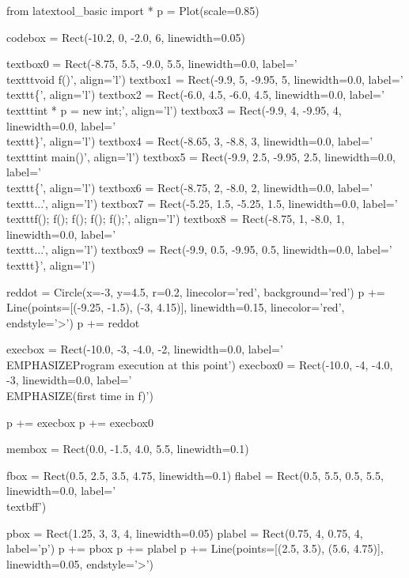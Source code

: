 \begin{python}
from latextool_basic import *
p = Plot(scale=0.85)

codebox = Rect(-10.2, 0, -2.0, 6, linewidth=0.05)

textbox0 = Rect(-8.75, 5.5, -9.0, 5.5, linewidth=0.0, label='\\texttt{void f()}', align='l')
textbox1 = Rect(-9.9, 5, -9.95, 5, linewidth=0.0, label='\\texttt{\{}', align='l')
textbox2 = Rect(-6.0, 4.5, -6.0, 4.5, linewidth=0.0, label='\\texttt{int * p = new int;}', align='l')
textbox3 = Rect(-9.9, 4, -9.95, 4, linewidth=0.0, label='\\texttt{\}}', align='l')
textbox4 = Rect(-8.65, 3, -8.8, 3, linewidth=0.0, label='\\texttt{int main()}', align='l')
textbox5 = Rect(-9.9, 2.5, -9.95, 2.5, linewidth=0.0, label='\\texttt{\{}', align='l')
textbox6 = Rect(-8.75, 2, -8.0, 2, linewidth=0.0, label='\\texttt{...}', align='l')
textbox7 = Rect(-5.25, 1.5, -5.25, 1.5, linewidth=0.0, label='\\texttt{f(); f(); f(); f(); f();}', align='l')
textbox8 = Rect(-8.75, 1, -8.0, 1, linewidth=0.0, label='\\texttt{...}', align='l')
textbox9 = Rect(-9.9, 0.5, -9.95, 0.5, linewidth=0.0, label='\\texttt{\}}', align='l')

reddot = Circle(x=-3, y=4.5, r=0.2, linecolor='red', background='red')
p += Line(points=[(-9.25, -1.5), (-3, 4.15)], linewidth=0.15, linecolor='red', endstyle='>')
p += reddot

execbox = Rect(-10.0, -3, -4.0, -2, linewidth=0.0,
               label='\\EMPHASIZE{Program execution at this point}')
execbox0 = Rect(-10.0, -4, -4.0, -3, linewidth=0.0,
               label='\\EMPHASIZE{(first time in f)}')

p += execbox
p += execbox0

membox = Rect(0.0, -1.5, 4.0, 5.5, linewidth=0.1)

fbox = Rect(0.5, 2.5, 3.5, 4.75, linewidth=0.1)
flabel = Rect(0.5, 5.5, 0.5, 5.5, linewidth=0.0, label='\\textbf{f}')

pbox = Rect(1.25, 3, 3, 4, linewidth=0.05)
plabel = Rect(0.75, 4, 0.75, 4, label='p')
p += pbox
p += plabel
p += Line(points=[(2.5, 3.5), (5.6, 4.75)], linewidth=0.05, endstyle='>')


\end{python}
